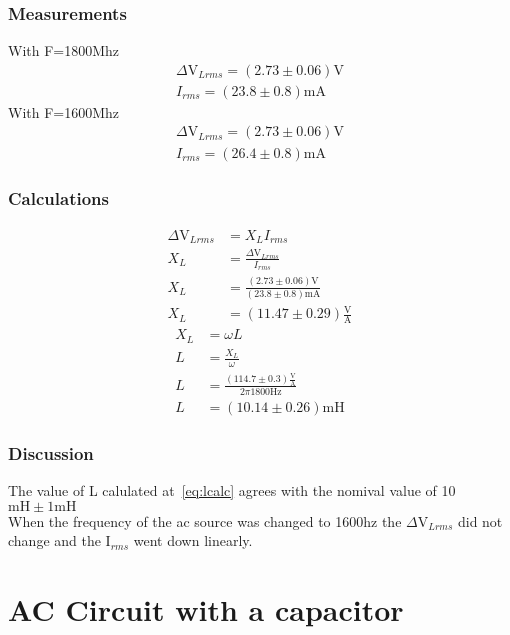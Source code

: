 \documentclass{report}
\begin{document}
\subsection{Measurements}
With F=1800Mhz
\begin{gather}
    \Delta\si{\volt}_{Lrms}=(2.73\pm0.06)\si{\volt}\\ 
    I_{rms}=(23.8\pm0.8)\si{\milli\ampere}
\end{gather}
With F=1600Mhz
\begin{gather}
    \Delta\si{\volt}_{Lrms}=(2.73\pm0.06)\si{\volt}\\ 
    I_{rms}=(26.4\pm0.8)\si{\milli\ampere}
\end{gather}
\subsection{Calculations}
\begin{align}
    \Delta\si{\volt}_{Lrms}&=X_{L}I_{rms}\nonumber\\
    X_{L}&=\frac{\Delta\si{\volt}_{Lrms}}{I_{rms}}\nonumber\\
    X_{L}&=\frac{(2.73\pm0.06)\si{\volt}}{(23.8\pm0.8)\si{\milli\ampere}}\nonumber\\
    X_{L}&=(11.47\pm 0.29)\frac{\si{\volt}}{\si{\ampere}} \label{eq:xlcalc}
\end{align}
\begin{align}
    X_{L}&=\omega L\nonumber\\
    L&=\frac{X_{L}}{\omega}\nonumber\\
    L&=\frac{(114.7\pm 0.3)\frac{\si{\volt}}{\si{\ampere}}}{2\pi1800\si{\hertz}} \nonumber\\
    L&=(10.14 \pm 0.26)\si{\milli}\si{\henry}\label{eq:lcalc}
\end{align}
\subsection{Discussion}
The value of L calulated at~\eqref{eq:lcalc} agrees with the nomival value of 10$\si{\milli}\si{\henry}\pm1\si{\milli}\si{\henry}$\\
When the frequency of the ac source was changed to 1600hz the $\Delta\si{\volt}_{Lrms}$ did not change and the I$_{rms}$ went down linearly.

\chapter{ AC Circuit with a capacitor}
\end{document}
